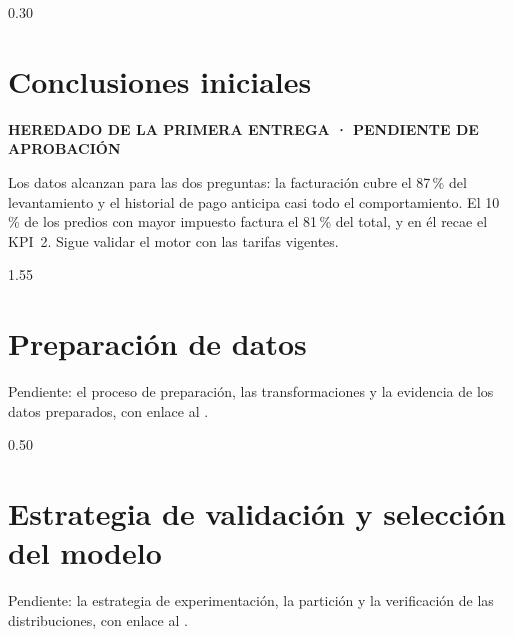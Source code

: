 \documentclass[12pt,letterpaper]{article}
\newcommand{\heredado}{\par\noindent\colorbox{amarillo}{\footnotesize\bfseries
  HEREDADO DE LA PRIMERA ENTREGA · PENDIENTE DE APROBACIÓN}\par\smallskip}
\begin{document}
\begin{espacio}{0.30}
\section{Conclusiones iniciales} %
\heredado
Los datos alcanzan para las dos preguntas: la facturación cubre el 87\,\% del levantamiento y el
historial de pago anticipa casi todo el comportamiento. El 10\,\% de los predios con mayor
impuesto factura el 81\,\% del total, y en él recae el KPI~2. Sigue validar el motor con las
tarifas vigentes.

\end{espacio}

\begin{espacio}{1.55}
\section{Preparación de datos} %
Pendiente: el proceso de preparación, las transformaciones y la evidencia de los datos
preparados, con enlace al
.

\end{espacio}

\begin{espacio}{0.50}
\section{Estrategia de validación y selección del modelo} %
Pendiente: la estrategia de experimentación, la partición y la verificación de las
distribuciones, con enlace al
.

\end{espacio}
\end{document}
